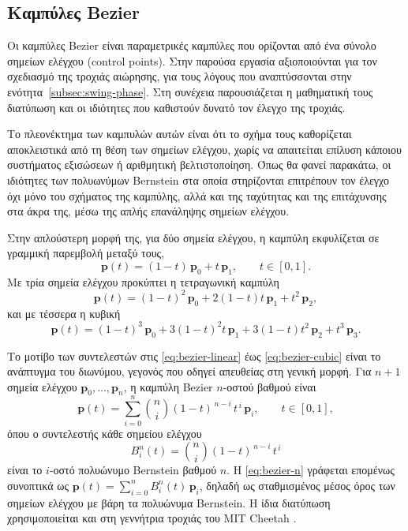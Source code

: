 \documentclass[11pt]{report}
\begin{document}
\subsection{Καμπύλες Bezier}
Οι καμπύλες Bezier είναι παραμετρικές καμπύλες που ορίζονται από ένα σύνολο
σημείων ελέγχου (control points). Στην παρούσα εργασία αξιοποιούνται για τον
σχεδιασμό της τροχιάς αιώρησης, για τους λόγους που αναπτύσσονται στην
ενότητα~\ref{subsec:swing-phase}. Στη συνέχεια παρουσιάζεται η μαθηματική τους
διατύπωση και οι ιδιότητες που καθιστούν δυνατό τον έλεγχο της τροχιάς.

Το πλεονέκτημα των καμπυλών αυτών είναι ότι το σχήμα τους καθορίζεται
αποκλειστικά από τη θέση των σημείων ελέγχου, χωρίς να απαιτείται επίλυση
κάποιου συστήματος εξισώσεων ή αριθμητική βελτιστοποίηση. Όπως θα φανεί
παρακάτω, οι ιδιότητες των πολυωνύμων Bernstein στα οποία στηρίζονται επιτρέπουν
τον έλεγχο όχι μόνο του σχήματος της καμπύλης, αλλά και της ταχύτητας και της
επιτάχυνσης στα άκρα της, μέσω της απλής επανάληψης σημείων ελέγχου.

Στην απλούστερη μορφή της, για δύο σημεία ελέγχου, η καμπύλη εκφυλίζεται σε
γραμμική παρεμβολή μεταξύ τους,
\begin{equation}
\mathbf{p}(t) = (1-t)\,\mathbf{p}_0 + t\,\mathbf{p}_1, \qquad t \in [0,1].
\label{eq:bezier-linear}
\end{equation}
Με τρία σημεία ελέγχου προκύπτει η τετραγωνική καμπύλη
\begin{equation}
\mathbf{p}(t) = (1-t)^{2}\,\mathbf{p}_0 + 2(1-t)t\,\mathbf{p}_1 + t^{2}\,\mathbf{p}_2,
\label{eq:bezier-quadratic}
\end{equation}
και με τέσσερα η κυβική
\begin{equation}
\mathbf{p}(t) = (1-t)^{3}\,\mathbf{p}_0 + 3(1-t)^{2}t\,\mathbf{p}_1
+ 3(1-t)t^{2}\,\mathbf{p}_2 + t^{3}\,\mathbf{p}_3.
\label{eq:bezier-cubic}
\end{equation}

Το μοτίβο των συντελεστών στις \eqref{eq:bezier-linear} έως
\eqref{eq:bezier-cubic} είναι το ανάπτυγμα του διωνύμου, γεγονός που οδηγεί
απευθείας στη γενική μορφή. Για $n+1$ σημεία ελέγχου
$\mathbf{p}_0, \dots, \mathbf{p}_n$, η καμπύλη Bezier $n$-οστού βαθμού είναι
\begin{equation}
\mathbf{p}(t) = \sum_{i=0}^{n} \binom{n}{i}(1-t)^{\,n-i}\,t^{\,i}\,\mathbf{p}_i,
\qquad t \in [0,1],
\label{eq:bezier-n}
\end{equation}
όπου ο συντελεστής κάθε σημείου ελέγχου
\begin{equation}
B_i^{n}(t) = \binom{n}{i}(1-t)^{\,n-i}\,t^{\,i}
\label{eq:bernstein}
\end{equation}
είναι το $i$-οστό πολυώνυμο Bernstein βαθμού $n$. Η
\eqref{eq:bezier-n} γράφεται επομένως συνοπτικά ως
$\mathbf{p}(t) = \sum_{i=0}^{n} B_i^{n}(t)\,\mathbf{p}_i$, δηλαδή ως
σταθμισμένος μέσος όρος των σημείων ελέγχου με βάρη τα πολυώνυμα Bernstein. Η
ίδια διατύπωση χρησιμοποιείται και στη γεννήτρια τροχιάς του MIT Cheetah
\cite{hyun_high_2014}.
\end{document}
